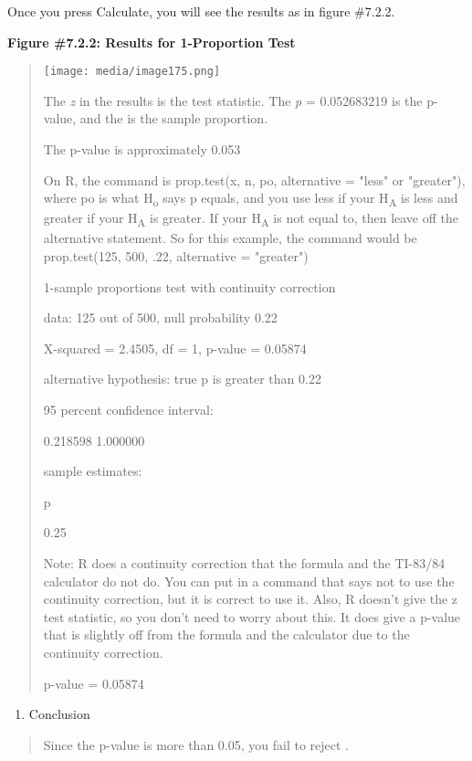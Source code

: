 \documentclass[]{book}
\providecommand{\tightlist}{%
  \setlength{\itemsep}{0pt}\setlength{\parskip}{0pt}}
\begin{document}
Once you press Calculate, you will see the results as in figure \#7.2.2.

\textbf{Figure \#7.2.2: Results for 1-Proportion Test}

\begin{quote}
\texttt{[image: media/image175.png]}

The \emph{z} in the results is the test statistic. The \emph{p} = 0.052683219 is
the p-value, and the is the sample proportion.

The p-value is approximately 0.053

On R, the command is prop.test(x, n, po, alternative = "less" or
"greater"), where po is what H\textsubscript{o} says p equals, and you use less if
your H\textsubscript{A} is less and greater if your H\textsubscript{A} is greater. If your H\textsubscript{A} is
not equal to, then leave off the alternative statement. So for this
example, the command would be prop.test(125, 500, .22, alternative =
"greater")

1-sample proportions test with continuity correction

data: 125 out of 500, null probability 0.22

X-squared = 2.4505, df = 1, p-value = 0.05874

alternative hypothesis: true p is greater than 0.22

95 percent confidence interval:

0.218598 1.000000

sample estimates:

p

0.25

Note: R does a continuity correction that the formula and the TI-83/84
calculator do not do. You can put in a command that says not to use
the continuity correction, but it is correct to use it. Also, R
doesn't give the z test statistic, so you don't need to worry about
this. It does give a p-value that is slightly off from the formula and
the calculator due to the continuity correction.

p-value = 0.05874
\end{quote}

\begin{enumerate}
\def\labelenumi{\arabic{enumi}.}
\setcounter{enumi}{4}
\tightlist
\item
  Conclusion
\end{enumerate}

\begin{quote}
Since the p-value is more than 0.05, you fail to reject .
\end{quote}
\end{document}
